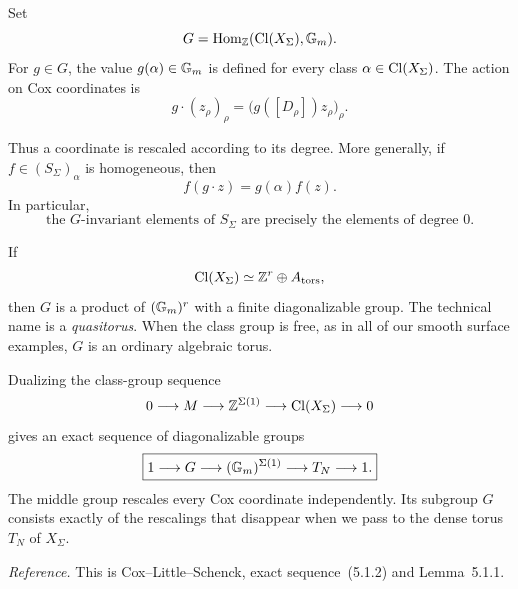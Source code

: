 \begin{definition}
\label{def:cox-rescaling-group}
Set
\[
G
=
\operatorname{Hom}_{\mathbb{Z}}(\operatorname{Cl}(X_\Sigma),\mathbb{G}_{m}).
\]
For \(g\in G\), the value \(g(\alpha)\in\mathbb{G}_{m}\) is defined for every
class \(\alpha\in\operatorname{Cl}(X_\Sigma)\). The action on Cox coordinates is
\[
g\cdot(z_\rho)_\rho
=
\bigl(g([D_\rho])z_\rho\bigr)_\rho.
\]
\end{definition}

Thus a coordinate is rescaled according to its degree. More generally,
if \(f\in(S_\Sigma)_\alpha\) is homogeneous, then
\[
f(g\cdot z)=g(\alpha)f(z).
\]
In particular,
\[
\boxed{
\text{the }G\text{-invariant elements of }S_\Sigma
\text{ are precisely the elements of degree }0.
}
\]

\begin{observation}
If
\[
\operatorname{Cl}(X_\Sigma)\simeq\mathbb{Z}^r\oplus A_{\mathrm{tors}},
\]
then \(G\) is a product of \((\mathbb{G}_{m})^r\) with a finite diagonalizable
group. The technical name is a \emph{quasitorus}. When the class group
is free, as in all of our smooth surface examples, \(G\) is an
ordinary algebraic torus.
\end{observation}

Dualizing the class-group sequence
\[
0\longrightarrow M
\longrightarrow\mathbb{Z}^{\Sigma(1)}
\longrightarrow\operatorname{Cl}(X_\Sigma)
\longrightarrow0
\]
gives an exact sequence of diagonalizable groups
\[
\boxed{
1\longrightarrow G
\longrightarrow(\mathbb{G}_{m})^{\Sigma(1)}
\longrightarrow T_N
\longrightarrow1.
}
\]
The middle group rescales every Cox coordinate independently. Its
subgroup \(G\) consists exactly of the rescalings that disappear when
we pass to the dense torus \(T_N\) of \(X_\Sigma\).

\noindent
\textit{Reference.}
This is Cox--Little--Schenck, exact sequence~(5.1.2) and
Lemma~5.1.1.

